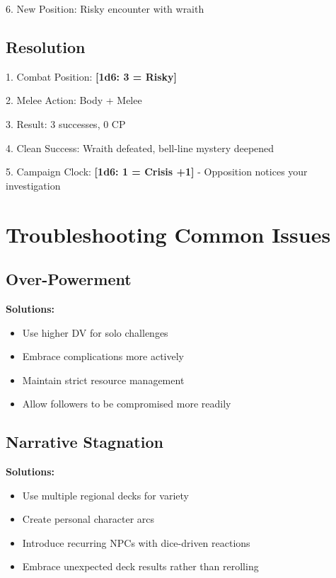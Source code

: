 \documentclass[11pt]{article}
\newcommand{\dice}[1]{\textbf{[1d6: #1]}}
\begin{document}
6. New Position: Risky encounter with wraith

\subsection{Resolution}

1. Combat Position: \dice{3 = Risky}

2. Melee Action: Body + Melee

3. Result: 3 successes, 0 CP

4. Clean Success: Wraith defeated, bell-line mystery deepened

5. Campaign Clock: \dice{1 = Crisis +1} - Opposition notices your investigation

\section{Troubleshooting Common Issues}

\subsection{Over-Powerment}

\begin{framed}
\textbf{Solutions:}
\begin{itemize}
    \item Use higher DV for solo challenges
    \item Embrace complications more actively
    \item Maintain strict resource management
    \item Allow followers to be compromised more readily
\end{itemize}
\end{framed}

\subsection{Narrative Stagnation}

\begin{framed}
\textbf{Solutions:}
\begin{itemize}
    \item Use multiple regional decks for variety
    \item Create personal character arcs
    \item Introduce recurring NPCs with dice-driven reactions
    \item Embrace unexpected deck results rather than rerolling
\end{itemize}
\end{framed}
\end{document}
